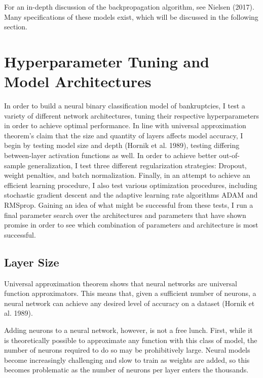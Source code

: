 \documentclass[12pt]{article}  %
\theoremstyle{definition}
\theoremstyle{remark}
\begin{document}
\par For an in-depth discussion of the backpropagation algorithm, see Nielsen (2017). Many specifications of these models exist, which will be discussed in the following section. 

\section{Hyperparameter Tuning and Model Architectures}
\par In order to build a neural binary classification model of bankruptcies, I test a variety of different network architectures, tuning their respective hyperparameters in order to achieve optimal performance. In line with universal approximation theorem's claim that the size and quantity of layers affects model accuracy, I begin by testing model size and depth (Hornik et al. 1989), testing differing between-layer activation functions as well. In order to achieve better out-of-sample generalization, I test three different regularization strategies: Dropout, weight penalties, and batch normalization. Finally, in an attempt to achieve an efficient learning procedure, I also test various optimization procedures, including stochastic gradient descent and the adaptive learning rate algorithms ADAM and RMSprop. Gaining an idea of what might be successful from these tests, I run a final parameter search over the architectures and parameters that have shown promise in order to see which  combination of parameters and architecture is most successful. 

\subsection{Layer Size}
\par Universal approximation theorem shows that neural networks are universal function approximators. This means that, given a sufficient number of neurons, a neural network can achieve any desired level of accuracy on a dataset (Hornik et al. 1989). 

\par Adding neurons to a neural network, however, is not a free lunch. First, while it is theoretically possible to approximate any function with this class of model, the number of neurons required to do so may be prohibitively large. Neural models become increasingly challenging and slow to train as weights are added, so this becomes problematic as the number of neurons per layer enters the thousands. 
\end{document}
